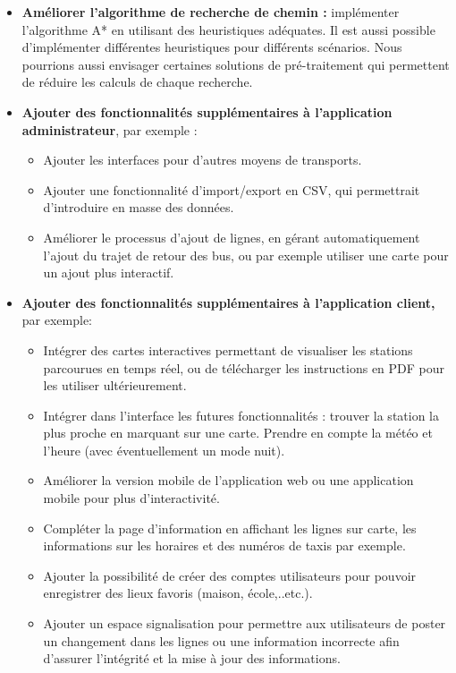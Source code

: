 \begin{itemize}
	\item \textbf{Améliorer l'algorithme de recherche de chemin :}  implémenter l'algorithme A* en utilisant des heuristiques adéquates. Il est aussi possible d'implémenter différentes heuristiques pour différents scénarios.\newline
	Nous pourrions aussi envisager certaines solutions de pré-traitement qui permettent de réduire les calculs de chaque recherche.
	\item \textbf{Ajouter des fonctionnalités supplémentaires à l'application administrateur}, par exemple :
		\begin{itemize}
			\item Ajouter les interfaces pour d'autres moyens de transports.
			\item Ajouter une fonctionnalité d'import/export en CSV, qui permettrait d'introduire en masse des données.
			\item Améliorer le processus d'ajout de lignes, en gérant automatiquement l'ajout du trajet de retour des bus, ou par exemple utiliser une carte pour un ajout plus interactif.
		\end{itemize}
	\item \textbf{Ajouter des fonctionnalités supplémentaires à l'application client,} par exemple:
		\begin{itemize}
			\item Intégrer des cartes interactives permettant de visualiser les stations parcourues en temps réel, ou de télécharger les instructions en PDF pour les utiliser ultérieurement.
			\item Intégrer dans l'interface les futures fonctionnalités : trouver la station la plus proche en marquant sur une carte. Prendre en compte la météo et l'heure (avec éventuellement un mode nuit).
			\item Améliorer la version mobile de l'application web ou une application mobile pour plus d'interactivité.
			\item Compléter la page d'information en affichant les lignes sur carte, les informations sur les horaires et des numéros de taxis par exemple.
			\item Ajouter la possibilité de créer des comptes utilisateurs pour pouvoir enregistrer des lieux favoris (maison, école,..etc.).
			\item Ajouter un espace signalisation pour permettre aux utilisateurs de poster un changement dans les lignes ou une information incorrecte afin d'assurer l'intégrité et la mise à jour des informations.
		\end{itemize}
\end{itemize}